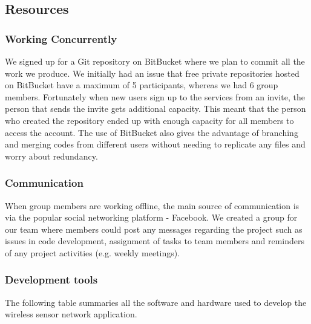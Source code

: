 \subsection{Resources}

\subsubsection{Working Concurrently}

We signed up for a Git repository on BitBucket \cite{bitbucket} where we plan to commit all the work we produce. We initially had an issue that free private repositories hosted on BitBucket have a maximum of 5 participants, whereas we had 6 group members. Fortunately when new users sign up to the services from an invite, the person that sends the invite gets additional capacity. This meant that the person who created the repository ended up with enough capacity for all members to access the account. The use of BitBucket also gives the advantage of branching and merging codes from different users without needing to replicate any files and worry about redundancy. 

\subsubsection{Communication}

When group members are working offline, the main source of communication is via the popular social networking platform - Facebook. We created a group for our team where members could post any messages regarding the project such as issues in code development, assignment of tasks to team members and reminders of any project activities (e.g. weekly meetings).

\subsubsection{Development tools}

The following table summaries all the software and hardware used to develop the wireless sensor network application. 



